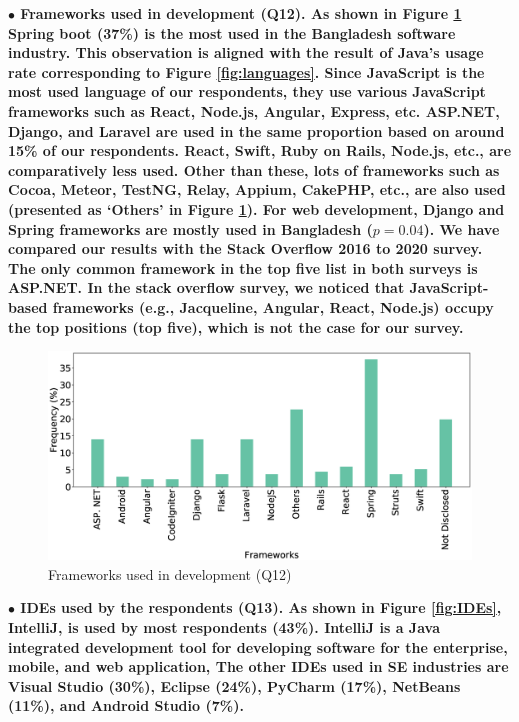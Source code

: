 \nd\bf{$\bullet$ Frameworks used in development (Q12).} As shown in Figure \ref{fig:frameworks} Spring boot (37\%) is the most used in the Bangladesh software industry. 
This observation is aligned with the result of Java's usage rate corresponding
to Figure \ref{fig:languages}. Since JavaScript is the most used language of our
respondents, they use various JavaScript frameworks such as React, Node.js,
Angular, Express, etc. ASP.NET, Django, and
Laravel are used in the same proportion based on around 15\% of our respondents.
React, Swift, Ruby on Rails, Node.js, etc., are comparatively less used. Other
than these, lots of frameworks such as Cocoa, Meteor, TestNG, Relay, Appium,
CakePHP, etc., are also used (presented as `Others' in Figure \ref{fig:frameworks}). For web development, Django
and Spring frameworks are mostly used in Bangladesh ($p=0.04$). We have compared
our results with the Stack Overflow 2016 to 2020
survey\citep{StackoverflowSurvey2017, StackoverflowSurvey2018,
StackoverflowSurvey2019, StackoverflowSurvey2020}. The only common framework in
the top five list in both surveys is ASP.NET. In the stack overflow survey, we
noticed that JavaScript-based frameworks (e.g., Jacqueline, Angular, React,
Node.js) occupy the top positions (top five), which is not the case for our
survey.

\begin{figure}[t]
\centering
  \includegraphics[scale=0.18]{Figures/Respondents_frameworks}
  \caption{Frameworks used in development (Q12)}
  \label{fig:frameworks}
\end{figure}

\nd\bf{$\bullet$ IDEs used by the respondents (Q13).} As shown in Figure \ref{fig:IDEs},
IntelliJ, is used by most respondents (43\%). IntelliJ is a Java integrated development tool for developing software for the
enterprise, mobile, and web application, The
other IDEs used in SE industries are Visual Studio (30\%), Eclipse (24\%),
PyCharm (17\%), NetBeans (11\%), and Android Studio (7\%).

